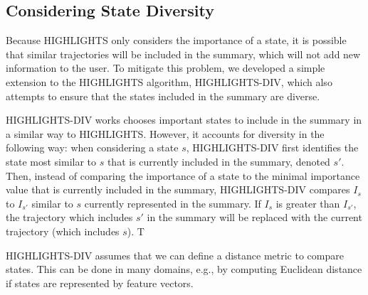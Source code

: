 \subsection{Considering State Diversity}
Because HIGHLIGHTS only considers the importance of a state, it is possible that similar trajectories will be included in the summary, which will not add new information to the user. To mitigate this problem, we developed a simple extension to the HIGHLIGHTS algorithm, HIGHLIGHTS-DIV, which also attempts to ensure that the states included in the summary are diverse. 

HIGHLIGHTS-DIV works chooses important states to include in the summary in a similar way to HIGHLIGHTS. However, it accounts for diversity in the following way: when considering a state $s$, HIGHLIGHTS-DIV first identifies the state most similar to $s$ that is currently included in the summary, denoted $s'$. Then, instead of comparing the importance of a state to the minimal importance value that is currently included in the summary, HIGHLIGHTS-DIV compares $I_{s}$ to $I_{s'}$ similar to $s$ currently represented in the summary. If $I_{s}$ is greater than $I_{s'}$, the trajectory which includes $s'$ in the summary will be replaced with the current trajectory (which includes $s$). T

HIGHLIGHTS-DIV assumes that we can define a distance metric to compare states. This can be done in many domains,  e.g., by computing Euclidean distance if states are represented by feature vectors.


